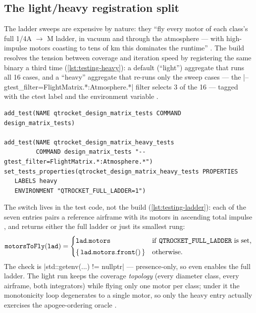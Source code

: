\subsection{The light/heavy registration split}\label{sec:testing-heavy}

The ladder sweeps are expensive by nature: they ``fly every motor of each class's full
1/4A $\to$ M ladder, in vacuum and through the atmosphere --- with high-impulse motors
coasting to tens of km this dominates the runtime'' . The
build resolves the tension between coverage and iteration speed by registering the same
binary a third time (\cref{lst:testing-heavy}): a default (``light'') aggregate that runs
all 16 cases, and a ``heavy'' aggregate that re-runs only the sweep cases --- the
\cppinline|--gtest_filter=FlightMatrix.*:Atmosphere.*| filter selects 3 of the 16 ---
tagged with the ctest label  and the environment variable
 .

\begin{listing}[htbp]
\begin{verbatim}
add_test(NAME qtrocket_design_matrix_tests COMMAND design_matrix_tests)

add_test(NAME qtrocket_design_matrix_heavy_tests
         COMMAND design_matrix_tests "--gtest_filter=FlightMatrix.*:Atmosphere.*")
set_tests_properties(qtrocket_design_matrix_heavy_tests PROPERTIES
   LABELS heavy
   ENVIRONMENT "QTROCKET_FULL_LADDER=1")
\end{verbatim}
\caption{The double registration of the design-matrix binary
. The light entry runs the whole suite with one motor
per class; the heavy entry re-runs just the two sweep suites under the full-ladder
environment variable, labeled so ctest can include or exclude it by
cost.}\label{lst:testing-heavy}
\end{listing}

The switch lives in the test code, not the build (\cref{lst:testing-ladder}): each of the
seven  entries pairs a reference airframe with its motors in ascending total
impulse , and  returns either the
full ladder or just its smallest rung:
\begin{equation*}
\mathtt{motorsToFly}(\mathtt{lad}) =
\begin{cases}
\mathtt{lad.motors} & \text{if \texttt{QTROCKET\_FULL\_LADDER} is set,}\\[2pt]
\{\,\mathtt{lad.motors.front()}\,\} & \text{otherwise.}
\end{cases}
\end{equation*}
The check is \cppinline|std::getenv(...) != nullptr|
 --- presence-only, so even
 enables the full ladder. The light run keeps the
coverage \emph{topology} (every diameter class, every airframe, both integrators) while
flying only one motor per class; under it the monotonicity loop degenerates to a single
motor, so only the heavy entry actually exercises the apogee-ordering oracle
.


